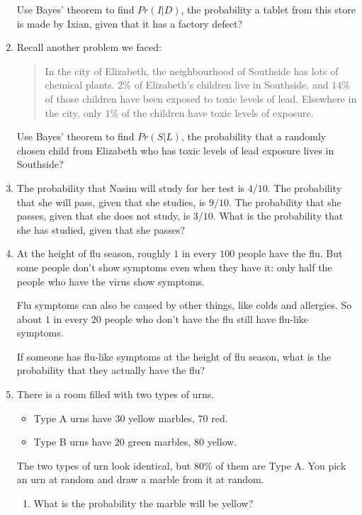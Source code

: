 \documentclass[]{tufte-book}
\providecommand{\tightlist}{%
  \setlength{\itemsep}{0pt}\setlength{\parskip}{0pt}}
\begin{document}
\begin{enumerate}
  Use Bayes' theorem to find \(Pr(I | D)\), the probability a tablet from this store is made by Ixian, given that it has a factory defect?
\item
  Recall another problem we faced:

  \begin{quote}
  In the city of Elizabeth, the neighbourhood of Southside has lots of chemical plants. \(2\%\) of Elizabeth's children live in Southside, and \(14\%\) of those children have been exposed to toxic levels of lead. Elsewhere in the city, only \(1\%\) of the children have toxic levels of exposure.
  \end{quote}

  Use Bayes' theorem to find \(Pr(S | L)\), the probability that a randomly chosen child from Elizabeth who has toxic levels of lead exposure lives in Southside?
\item
  The probability that Nasim will study for her test is \(4/10\). The probability that she will pass, given that she studies, is \(9/10\). The probability that she passes, given that she does not study, is \(3/10\). What is the probability that she has studied, given that she passes?
\item
  At the height of flu season, roughly \(1\) in every \(100\) people have the flu. But some people don't show symptoms even when they have it: only half the people who have the virus show symptoms.

  Flu symptoms can also be caused by other things, like colds and allergies. So about \(1\) in every \(20\) people who don't have the flu still have flu-like symptoms.

  If someone has flu-like symptoms at the height of flu season, what is the probability that they actually have the flu?
\item
  There is a room filled with two types of urns.

  \begin{itemize}
  \tightlist
  \item
    Type A urns have \(30\) yellow marbles, \(70\) red.
  \item
    Type B urns have \(20\) green marbles, \(80\) yellow.
  \end{itemize}

  The two types of urn look identical, but \(80\%\) of them are Type A. You pick an urn at random and draw a marble from it at random.

  \begin{enumerate}
  \def\labelenumii{\alph{enumii}.}
  \tightlist
  \item
    What is the probability the marble will be yellow?
  \end{enumerate}


\end{enumerate}
\end{document}
